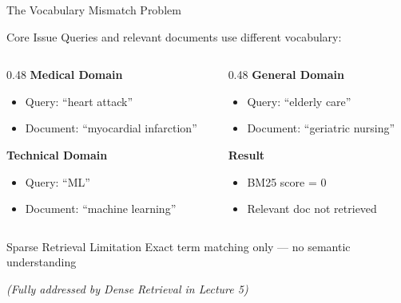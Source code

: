 \documentclass[aspectratio=169]{beamer}
\begin{document}
\begin{frame}[plain]
\sectionpage
\end{frame}

\begin{frame}{The Vocabulary Mismatch Problem}
\begin{exampleblock}{Core Issue}
Queries and relevant documents use different vocabulary:
\end{exampleblock}

\vspace{1em}

\begin{columns}
\begin{column}{0.48\textwidth}
\textbf{Medical Domain}
\begin{itemize}
    \item Query: ``heart attack''
    \item Document: ``myocardial infarction''
\end{itemize}

\vspace{0.5em}

\textbf{Technical Domain}
\begin{itemize}
    \item Query: ``ML''
    \item Document: ``machine learning''
\end{itemize}
\end{column}

\begin{column}{0.48\textwidth}
\textbf{General Domain}
\begin{itemize}
    \item Query: ``elderly care''
    \item Document: ``geriatric nursing''
\end{itemize}

\vspace{0.5em}

\textbf{Result}
\begin{itemize}
    \item BM25 score = 0
    \item Relevant doc not retrieved
\end{itemize}
\end{column}
\end{columns}

\vspace{1em}

\begin{alertblock}{Sparse Retrieval Limitation}
Exact term matching only --- no semantic understanding
\end{alertblock}

\vspace{0.5em}

\textit{(Fully addressed by Dense Retrieval in Lecture 5)}
\end{frame}
\end{document}
